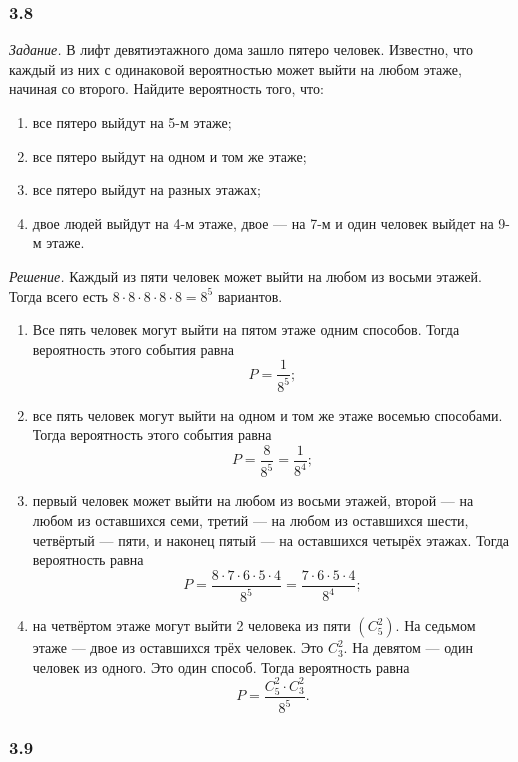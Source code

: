 \subsubsection*{3.8}

\textit{Задание.} В лифт девятиэтажного дома зашло пятеро человек.
Известно, что каждый из них с одинаковой вероятностью может выйти на любом этаже, начиная со второго.
Найдите вероятность того, что:
\begin{enumerate}[label=\alph*)]
\item все пятеро выйдут на 5-м этаже;
\item все пятеро выйдут на одном и том же этаже;
\item все пятеро выйдут на разных этажах;
\item двое людей выйдут на 4-м этаже, двое --- на 7-м и один человек выйдет на 9-м этаже.
\end{enumerate}

\textit{Решение.} Каждый из пяти человек может выйти на любом из восьми этажей.
Тогда всего есть $8 \cdot 8 \cdot 8 \cdot 8 \cdot 8 = 8^5$ вариантов.

\begin{enumerate}[label=\alph*)]
\item Все пять человек могут выйти на пятом этаже одним способов.
Тогда вероятность этого события равна
$$P =
\frac{1}{8^5};$$

\item все пять человек могут выйти на одном и том же этаже восемью способами.
Тогда вероятность этого события равна
$$P =
\frac{8}{8^5} =
\frac{1}{8^4};$$

\item первый человек может выйти на любом из восьми этажей, второй --- на любом из оставшихся семи,
третий --- на любом из оставшихся шести, четвёртый --- пяти, и наконец пятый --- на оставшихся четырёх этажах.
Тогда вероятность равна
$$P =
\frac{8 \cdot 7 \cdot 6 \cdot 5 \cdot 4}{8^5} =
\frac{7 \cdot 6 \cdot 5 \cdot 4}{8^4};$$

\item на четвёртом этаже могут выйти 2 человека из пяти $ \left( C_5^2 \right) $.
На седьмом этаже --- двое из оставшихся трёх человек.
Это $C_3^2$.
На девятом --- один человек из одного.
Это один способ.
Тогда вероятность равна
$$P =
\frac{C_5^2 \cdot C_3^2}{8^5}.$$
\end{enumerate}

\subsubsection*{3.9}

